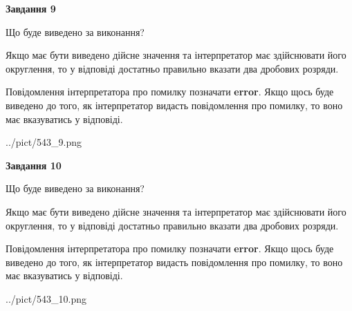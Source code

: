\documentclass[12pt, ukrainian]{article}
\begin{document}
{\begin {Large}
{\begin {center}\textbf{Завдання 9}\end {center}}\par
Що буде виведено за виконання? \par

Якщо має бути виведено дійсне значення та інтерпретатор має здійснювати його округлення, 
то у відповіді достатньо правильно вказати два дробових розряди.

Повідомлення інтерпретатора про помилку позначати \textbf{error}.
Якщо щось буде виведено до того, як інтерпретатор видасть повідомлення про помилку, 
то воно має вказуватись у відповіді. \par

\begin{center}
	{../pict/543_9.png}
\end{center}
\newpage

{\begin {center}\textbf{Завдання 10}\end {center}}\par
Що буде виведено за виконання? \par

Якщо має бути виведено дійсне значення та інтерпретатор має здійснювати його округлення, 
то у відповіді достатньо правильно вказати два дробових розряди.

Повідомлення інтерпретатора про помилку позначати \textbf{error}.
Якщо щось буде виведено до того, як інтерпретатор видасть повідомлення про помилку, 
то воно має вказуватись у відповіді. \par

\begin{center}
	{../pict/543_10.png}
\end{center}
\newpage

\end {Large}}
\end{document}
